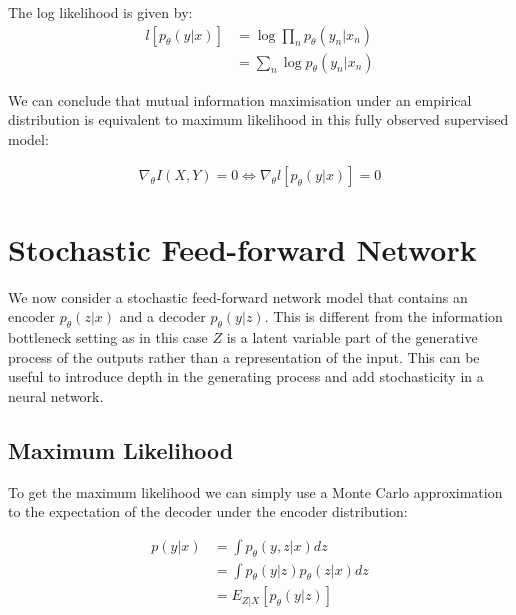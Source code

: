 \documentclass[11pt,oneside,openright]{report}
\begin{document}
The log likelihood is given by:
\begin{align}
 l[p_\theta(y|x)] &= \log \prod_n p_\theta(y_n|x_n)\\
 	      &= \sum_n \log p_\theta(y_n|x_n)
\end{align}

We can conclude that mutual information maximisation under an empirical distribution is equivalent to maximum likelihood in this fully observed supervised model:

\begin{align}
\nabla_\theta I(X,Y) = 0 \Leftrightarrow \nabla_\theta l[p_\theta(y|x)] = 0
\end{align}

\section{Stochastic Feed-forward Network}

We now consider a stochastic feed-forward network model that contains an encoder $p_\theta(z|x)$ and a decoder $p_\theta(y|z)$. This is different from the information bottleneck setting as in this case $Z$ is a latent variable part of the generative process of the outputs rather than a representation of the input. This can be useful to introduce depth in the generating process and add stochasticity in a neural network. 

\begin{figure}[H]
\centering
{}
\end{figure}

\subsection{Maximum Likelihood}

To get the maximum likelihood we can simply use a Monte Carlo approximation to the expectation of the decoder under the encoder distribution:

\begin{align}
 p(y|x) &= \int p_\theta(y, z|x) dz \\
 &= \int p_\theta(y|z) p_\theta(z|x) dz \\
 &= E_{Z | X}[p_\theta(y|z)] 
\end{align}
\end{document}
